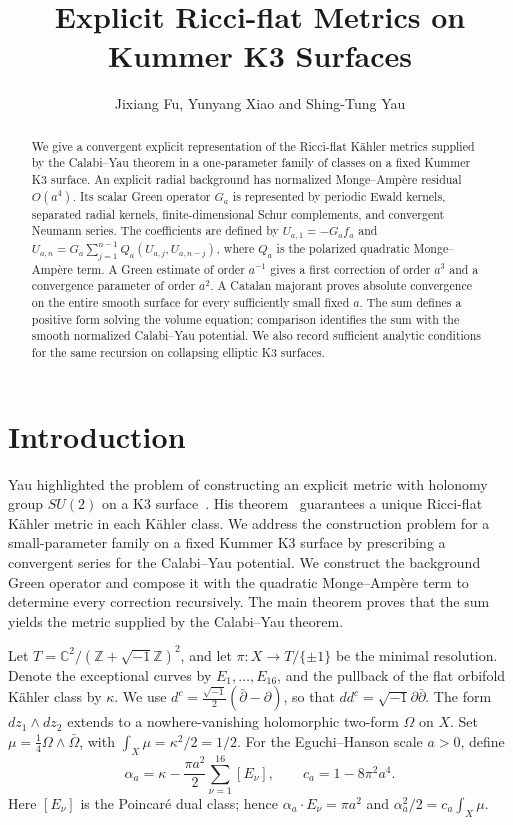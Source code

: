 \documentclass[11pt,a4paper,twoside]{article}
\title{Explicit Ricci-flat Metrics on Kummer K3 Surfaces}
\author{Jixiang Fu, Yunyang Xiao and Shing-Tung Yau}
\date{}
\numberwithin{equation}{section}
\theoremstyle{definition}
\theoremstyle{remark}
\newcommand{\ii}{\sqrt{-1}}
\begin{document}
\maketitle 

\begin{abstract}
We give a convergent explicit representation of the Ricci-flat
K\"ahler metrics supplied by the Calabi--Yau theorem in a
one-parameter family of classes on a fixed Kummer K3 surface.
An explicit radial background has normalized Monge--Amp\`ere
residual \(O(a^4)\). Its scalar Green operator \(G_a\) is
represented by periodic Ewald kernels, separated radial kernels,
finite-dimensional Schur complements, and convergent Neumann series.
The coefficients are defined by \(U_{a,1}=-G_af_a\) and
\(U_{a,n}=G_a\sum_{j=1}^{n-1}Q_a(U_{a,j},U_{a,n-j})\), where
\(Q_a\) is the polarized quadratic Monge--Amp\`ere term.
A Green estimate of order \(a^{-1}\) gives a first correction
of order \(a^3\) and a convergence parameter of order \(a^2\).
A Catalan majorant proves absolute convergence on the entire smooth
surface for every sufficiently small fixed \(a\). The sum defines
a positive form solving the volume equation; comparison identifies the sum
with the smooth normalized Calabi--Yau potential. We also record
sufficient analytic conditions for the same recursion on collapsing
elliptic K3 surfaces.
\end{abstract}

\section{Introduction}
\label{sec:introduction}
Yau highlighted the problem of constructing an explicit metric
with holonomy group \(SU(2)\) on a K3
surface~\cite[pp.~333--334]{YauGeometricStructure}.
His theorem~\cite{Yau1978} guarantees a unique Ricci-flat K\"ahler
metric in each K\"ahler class. We address the construction problem
for a small-parameter family on a fixed Kummer K3 surface by
prescribing a convergent series for the Calabi--Yau potential.
We construct the background Green operator and compose it with
the quadratic Monge--Amp\`ere term to determine every correction
recursively. The main theorem proves that the sum yields the metric
supplied by the Calabi--Yau theorem.


Let \(T=\mathbb C^2/(\mathbb Z+\ii\mathbb Z)^2\), and let
\(\pi:X\to T/\{\pm1\}\) be the minimal resolution. Denote the
exceptional curves by \(E_1,\ldots,E_{16}\), and the pullback of
the flat orbifold K\"ahler class by \(\kappa\). We use
\(d^c=\frac{\ii}{2}(\bar\partial-\partial)\), so that
\(dd^c=\ii\partial\bar\partial\). The form \(dz_1\wedge dz_2\)
extends to a nowhere-vanishing holomorphic two-form \(\Omega\)
on \(X\). Set \(\mu=\frac14\Omega\wedge\bar\Omega\), with
\(\int_X\mu=\kappa^2/2=1/2\). For the Eguchi--Hanson scale
\(a>0\), define
\begin{equation}\label{eq:intro-kummer-class}
\alpha_a=\kappa-\frac{\pi a^2}{2}\sum_{\nu=1}^{16}[E_\nu],
\qquad c_a=1-8\pi^2a^4.
\end{equation}
Here \([E_\nu]\) is the Poincar\'e dual class; hence
\(\alpha_a\cdot E_\nu=\pi a^2\) and
\(\alpha_a^2/2=c_a\int_X\mu\).
\end{document}
